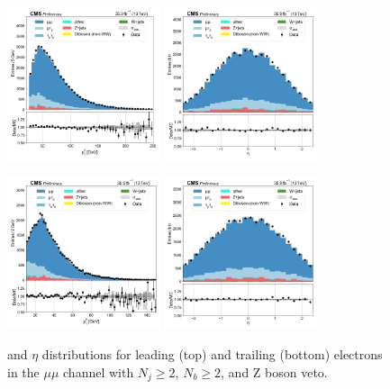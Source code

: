 \begin{figure}[htb!]
    \centering
    \includegraphics[width=0.4\textwidth]{chapters/Appendix/sectionPlots/figures/data_mc_overlays/mumu_2016_cat_gt2_gt2_b_signal_linear_lepton_lepton1_pt}
    \includegraphics[width=0.4\textwidth]{chapters/Appendix/sectionPlots/figures/data_mc_overlays/mumu_2016_cat_gt2_gt2_b_signal_linear_lepton_lepton1_eta}

    \includegraphics[width=0.4\textwidth]{chapters/Appendix/sectionPlots/figures/data_mc_overlays/mumu_2016_cat_gt2_gt2_b_signal_linear_lepton_lepton2_pt}
    \includegraphics[width=0.4\textwidth]{chapters/Appendix/sectionPlots/figures/data_mc_overlays/mumu_2016_cat_gt2_gt2_b_signal_linear_lepton_lepton2_eta}
    \caption{\pt and $\eta$ distributions for leading (top) and trailing
    (bottom) electrons in the $\mu\mu$ channel with $N_{j} \geq 2$, $N_{b}
    \geq 2$, and Z boson veto.}
    \label{fig:mumu_2_kinematic}
\end{figure}

